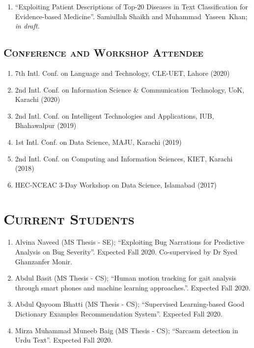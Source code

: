 \documentclass[a4paper, 10pt]{article}
\begin{document}
\begin{enumerate}
	
	\item ``Exploiting Patient Descriptions of Top-20 Diseases in Text Classification for Evidence-based Medicine''. Samiullah Shaikh and \textcolor{NavyBlue}{Muhammad~Yaseen~Khan}; \emph{\small in draft.}
	


\end{enumerate}


\subsection*{\normalfont\textsc{Conference and Workshop Attendee}}
\begin{enumerate}
\itemsep-4pt
\item 7th Intl. Conf. on Language and Technology, CLE-UET, Lahore (2020)
\item 2nd Intl. Conf. on Information Science \& Communication Technology, UoK, Karachi (2020)
\item 2nd Intl. Conf. on Intelligent Technologies and Applications, IUB, Bhahawalpur (2019)
\item 1st Intl. Conf. on Data Science, MAJU, Karachi (2019)
\item 2nd Intl. Conf. on Computing and Information Sciences, KIET, Karachi (2018)
\item HEC-NCEAC 3-Day Workshop on Data Science, Islamabad (2017) 
\end{enumerate}


\section*{\normalfont\textsc{Current Students}}
\begin{enumerate}
\itemsep-4pt 
 \item Alvina Naveed (MS Thesis - SE); ``Exploiting Bug Narrations for Predictive Analysis on Bug Severity''. Expected Fall 2020. Co-supervised by Dr Syed Ghanzanfer Monir.
 
 \item Abdul Basit (MS Thesis - CS); ``Human motion tracking for gait analysis through smart phones and machine learning approaches.''. Expected Fall 2020.
 
  \item Abdul Qayoom Bhatti (MS Thesis - CS); ``Supervised Learning-based Good Dictionary Examples Recommendation System''. Expected Fall 2020. 
  
    \item Mirza Muhammad Muneeb Baig (MS Thesis - CS); ``Sarcasm detection in Urdu Text''. Expected Fall 2020.
 
\end{enumerate}
\end{document}
